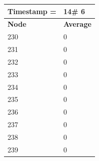 \begin{tabular}{|l||l|}
\hline
\textbf{Timestamp =} & \textbf{14}\# 6\\\hline
	\textbf{Node} & \textbf{Average} \\ \hline
\hline
	230 & 0 \\ \hline
	231 & 0 \\ \hline
	232 & 0 \\ \hline
	233 & 0 \\ \hline
	234 & 0 \\ \hline
	235 & 0 \\ \hline
	236 & 0 \\ \hline
	237 & 0 \\ \hline
	238 & 0 \\ \hline
	239 & 0 \\ \hline
\end{tabular}

